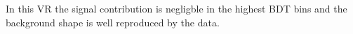 In this VR the signal contribution is negligble in the highest BDT bins and the background shape is well reproduced by the data.
